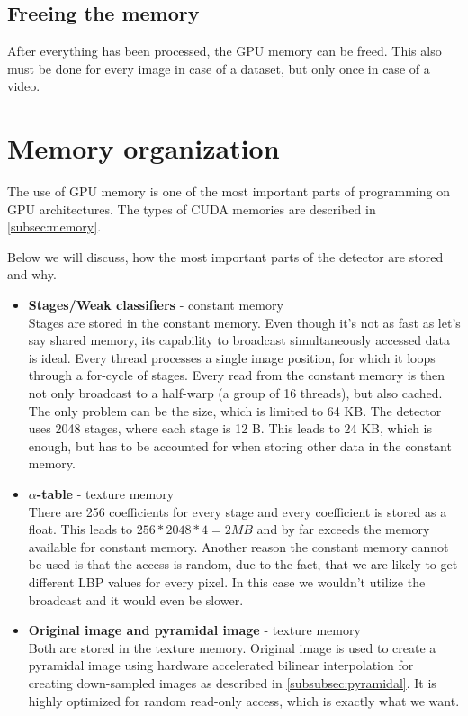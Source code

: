 \subsection{Freeing the memory}\label{subsec:free}

After everything has been processed, the GPU memory can be freed. This also must be done for every image in case of a dataset, but only once in case of a video.

\section{Memory organization} \label{sec:memory-organization}

The use of GPU memory is one of the most important parts of programming on GPU architectures. The types of CUDA memories are described in \ref{subsec:memory}.

Below we will discuss, how the most important parts of the detector are stored and why.

\begin{itemize}
\item \textbf{Stages/Weak classifiers} - constant memory \\
Stages are stored in the constant memory. Even though it's not as fast as let's say shared memory, its capability to broadcast simultaneously accessed data is ideal. Every thread processes a single image position, for which it loops through a for-cycle of stages. Every read from the constant memory is then not only broadcast to a half-warp (a group of 16 threads), but also cached. The only problem can be the size, which is limited to 64 KB. The detector uses 2048 stages, where each stage is 12 B. This leads to 24 KB, which is enough, but has to be accounted for when storing other data in the constant memory.

\item \textbf{$\alpha$-table} - texture memory \\
There are 256 coefficients for every stage and every coefficient is stored as a float. This leads to $256 * 2048 * 4 = 2 MB$ and by far exceeds the memory available for constant memory. Another reason the constant memory cannot be used is that the access is random, due to the fact, that we are likely to get different LBP values for every pixel. In this case we wouldn't utilize the broadcast and it would even be slower.

\item \textbf{Original image and pyramidal image} - texture memory \\
Both are stored in the texture memory. Original image is used to create a pyramidal image using hardware accelerated bilinear interpolation for creating down-sampled images as described in \ref{subsubsec:pyramidal}. It is highly optimized for random read-only access, which is exactly what we want.
\end{itemize}

